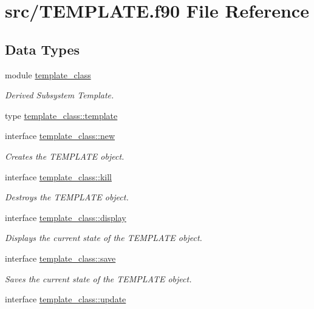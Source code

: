 \hypertarget{_t_e_m_p_l_a_t_e_8f90}{\section{src/\+T\+E\+M\+P\+L\+A\+T\+E.f90 File Reference}
\label{_t_e_m_p_l_a_t_e_8f90}
}
\subsection*{Data Types}
\begin{DoxyCompactItemize}
\item 
module \hyperlink{classtemplate__class}{template\+\_\+class}
\begin{DoxyCompactList}\small\item\em Derived Subsystem Template. \end{DoxyCompactList}\item 
type \hyperlink{structtemplate__class_1_1template}{template\+\_\+class\+::template}
\item 
interface \hyperlink{interfacetemplate__class_1_1new}{template\+\_\+class\+::new}
\begin{DoxyCompactList}\small\item\em Creates the T\+E\+M\+P\+L\+A\+T\+E object. \end{DoxyCompactList}\item 
interface \hyperlink{interfacetemplate__class_1_1kill}{template\+\_\+class\+::kill}
\begin{DoxyCompactList}\small\item\em Destroys the T\+E\+M\+P\+L\+A\+T\+E object. \end{DoxyCompactList}\item 
interface \hyperlink{interfacetemplate__class_1_1display}{template\+\_\+class\+::display}
\begin{DoxyCompactList}\small\item\em Displays the current state of the T\+E\+M\+P\+L\+A\+T\+E object. \end{DoxyCompactList}\item 
interface \hyperlink{interfacetemplate__class_1_1save}{template\+\_\+class\+::save}
\begin{DoxyCompactList}\small\item\em Saves the current state of the T\+E\+M\+P\+L\+A\+T\+E object. \end{DoxyCompactList}\item 
interface \hyperlink{interfacetemplate__class_1_1update}{template\+\_\+class\+::update}

\end{DoxyCompactItemize}
